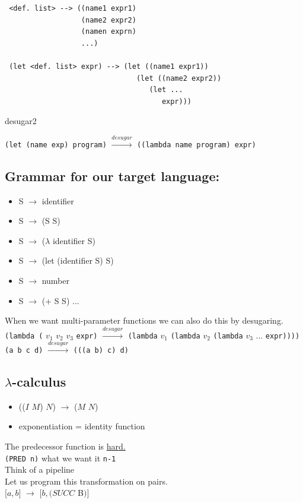 \documentclass{article}
\begin{document}
\begin{flushleft}
\begin{flushleft}
\begin{verbatim}
 <def. list> --> ((name1 expr1)
                  (name2 expr2)
                  (namen exprn)
                  ...)
                  
 (let <def. list> expr) --> (let ((name1 expr1))
                               (let ((name2 expr2))
                                  (let ...
                                     expr)))
\end{verbatim}
desugar2

\verb|(let (name exp) program)| $ \xrightarrow{desugar} $ \verb|((lambda name program) expr)| \\

\subsection*{Grammar for our target language:}
\begin{itemize}
 \item[] S $\rightarrow$ identifier
 \item[] S $\rightarrow$ (S S)
 \item[] S $\rightarrow$ ($\lambda$ identifier S)
 \item[] S $\rightarrow$ (let (identifier S) S)
 \item[] S $\rightarrow$ number
 \item[] S $\rightarrow$ (+ S S) ...
\end{itemize}
When we want multi-parameter functions we can also do this by desugaring.\\
\bigskip
\verb|(lambda (| $v_1$ $v_2$ $v_3$ \verb|expr)| $\xrightarrow{desugar}$ \verb|(lambda| $v_1$ \verb|(lambda| $v_2$ \verb|(lambda| $v_3$ ... \verb|expr))))|\\
\bigskip
\verb|(a b c d)| $\xrightarrow{desugar}$ \verb|(((a b) c) d)|
\end{flushleft}

\subsection*{$\lambda$-calculus}
\begin{flushleft}
  \begin{itemize}
   \item[] (($\mathit{I}$ $\mathit{M}$) $\mathit{N}$) $\rightarrow$ ($\mathit{M}$ $\mathit{N}$)
   \item[] exponentiation = identity function
  \end{itemize}
The predecessor function is \underline{hard.}\\
\verb|(PRED n)| what we want it \verb|n-1|\\
Think of a pipeline\\
\bigskip
Let us program this transformation on pairs.\\
$\mathit{[} \mathit{a,b} \mathit{]}$  $\rightarrow$ $\mathit{[} \mathit{b, (SUCC}$ B$) \mathit{]}$


\end{flushleft}
\end{flushleft}
\end{document}

